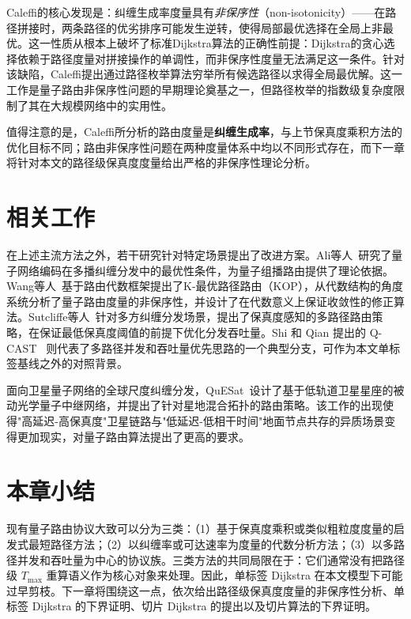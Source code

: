Caleffi的核心发现是：纠缠生成率度量具有\emph{非保序性}（non-isotonicity）——在路径拼接时，两条路径的优劣排序可能发生逆转，使得局部最优选择在全局上非最优。这一性质从根本上破坏了标准Dijkstra算法的正确性前提：Dijkstra的贪心选择依赖于路径度量对拼接操作的单调性，而非保序性度量无法满足这一条件。针对该缺陷，Caleffi提出通过路径枚举算法穷举所有候选路径以求得全局最优解。这一工作是量子路由非保序性问题的早期理论奠基之一，但路径枚举的指数级复杂度限制了其在大规模网络中的实用性。

值得注意的是，Caleffi所分析的路由度量是\textbf{纠缠生成率}，与上节保真度乘积方法的优化目标不同；路由非保序性问题在两种度量体系中均以不同形式存在，而下一章将针对本文的路径级保真度度量给出严格的非保序性理论分析。

\section{相关工作}
\label{sec:related-routing}

在上述主流方法之外，若干研究针对特定场景提出了改进方案。Ali等人~\cite{Ali2017Optimal}研究了量子网络编码在多播纠缠分发中的最优性条件，为量子组播路由提供了理论依据。Wang等人~\cite{Wang2025}基于路由代数框架提出了K-最优路径路由（KOP），从代数结构的角度系统分析了量子路由度量的非保序性，并设计了在代数意义上保证收敛性的修正算法。Sutcliffe等人~\cite{Sutcliffe2025}针对多方纠缠分发场景，提出了保真度感知的多路径路由策略，在保证最低保真度阈值的前提下优化分发吞吐量。Shi 和 Qian 提出的 Q-CAST~\cite{shi2020qcast} 则代表了多路径并发和吞吐量优先思路的一个典型分支，可作为本文单标签基线之外的对照背景。

面向卫星量子网络的全球尺度纠缠分发，QuESat~\cite{gu2025quesat}设计了基于低轨道卫星星座的被动光学量子中继网络，并提出了针对星地混合拓扑的路由策略。该工作的出现使得"高延迟-高保真度"卫星链路与"低延迟-低相干时间"地面节点共存的异质场景变得更加现实，对量子路由算法提出了更高的要求。

\section{本章小结}
\label{sec:routing-survey-summary}

现有量子路由协议大致可以分为三类：（1）基于保真度乘积或类似粗粒度度量的启发式最短路径方法；（2）以纠缠率或可达速率为度量的代数分析方法；（3）以多路径并发和吞吐量为中心的协议族。三类方法的共同局限在于：它们通常没有把路径级 $T_{\max}$ 重算语义作为核心对象来处理。因此，单标签 Dijkstra 在本文模型下可能过早剪枝。下一章将围绕这一点，依次给出路径级保真度度量的非保序性分析、单标签 Dijkstra 的下界证明、切片 Dijkstra 的提出以及切片算法的下界证明。

